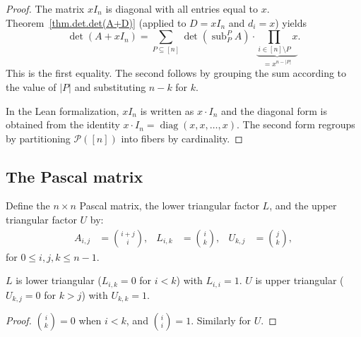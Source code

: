 \begin{proof}
The matrix $xI_n$ is diagonal with all entries equal to $x$.
Theorem~\ref{thm.det.det(A+D)} (applied to $D = xI_n$ and $d_i = x$)
yields
\[
\det(A+xI_n) = \sum_{P\subseteq [n]}
\det(\operatorname{sub}_P^P A) \cdot
\underbrace{\prod_{i\in [n]\setminus P} x}_{= x^{n-|P|}}.
\]
This is the first equality. The second follows by grouping the sum
according to the value of $|P|$ and substituting $n-k$ for $k$.

In the Lean formalization, $x I_n$ is written as
$x \cdot I_n$ and the diagonal form is obtained from the identity
$x \cdot I_n = \operatorname{diag}(x,x,\ldots,x)$.
The second form regroups by partitioning $\mathcal{P}([n])$ into
fibers by cardinality.
\end{proof}

\subsection{The Pascal matrix}

\begin{definition}
\label{def.pascal}
\leanhelper
\leanok
Define the $n\times n$ Pascal matrix, the lower triangular factor $L$,
and the upper triangular factor $U$ by:
\begin{align*}
A_{i,j} &= \binom{i+j}{i}, &
L_{i,k} &= \binom{i}{k}, &
U_{k,j} &= \binom{j}{k},
\end{align*}
for $0\le i,j,k \le n-1$.
\end{definition}

\begin{lemma}
\label{lem.pascal.triangular}
\leanhelper
\leanok
$L$ is lower triangular ($L_{i,k} = 0$ for $i < k$) with $L_{i,i} = 1$.
$U$ is upper triangular ($U_{k,j} = 0$ for $k > j$) with $U_{k,k} = 1$.
\end{lemma}

\begin{proof}
\leanok
$\binom{i}{k} = 0$ when $i < k$, and $\binom{i}{i} = 1$.
Similarly for $U$.
\end{proof}

